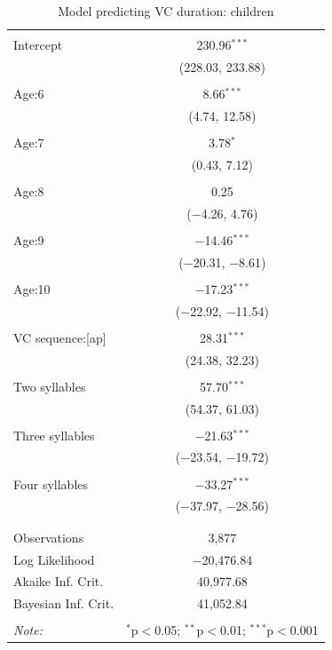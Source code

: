 \documentclass[a4paper,man,floatsintext,natbib,donotrepeattitle, apacite]{apa6}
\begin{document}
\begin{table}[!htbp] \centering 
  \caption{Model predicting VC duration: children} 
  \label{tab:child-dur-model} 
\begin{tabular}{@{\extracolsep{5pt}}lc} 
\\[-1.8ex]\hline 
\hline \\[-1.8ex] 
 Intercept & 230.96$^{***}$ \\ 
  & (228.03, 233.88) \\ 
  & \\ 
 Age:6 & 8.66$^{***}$ \\ 
  & (4.74, 12.58) \\ 
  & \\ 
 Age:7 & 3.78$^{*}$ \\ 
  & (0.43, 7.12) \\ 
  & \\ 
 Age:8 & 0.25 \\ 
  & ($-$4.26, 4.76) \\ 
  & \\ 
 Age:9 & $-$14.46$^{***}$ \\ 
  & ($-$20.31, $-$8.61) \\ 
  & \\ 
 Age:10 & $-$17.23$^{***}$ \\ 
  & ($-$22.92, $-$11.54) \\ 
  & \\ 
 VC sequence:[ap] & 28.31$^{***}$ \\ 
  & (24.38, 32.23) \\ 
  & \\ 
 Two syllables & 57.70$^{***}$ \\ 
  & (54.37, 61.03) \\ 
  & \\ 
 Three syllables & $-$21.63$^{***}$ \\ 
  & ($-$23.54, $-$19.72) \\ 
  & \\ 
 Four syllables & $-$33.27$^{***}$ \\ 
  & ($-$37.97, $-$28.56) \\ 
  & \\ 
\hline \\[-1.8ex] 
Observations & 3,877 \\ 
Log Likelihood & $-$20,476.84 \\ 
Akaike Inf. Crit. & 40,977.68 \\ 
Bayesian Inf. Crit. & 41,052.84 \\ 
\hline 
\hline \\[-1.8ex] 
\textit{Note:}  & \multicolumn{1}{r}{$^{*}$p$<$0.05; $^{**}$p$<$0.01; $^{***}$p$<$0.001} \\ 
\end{tabular} 
\end{table}
\end{document}
